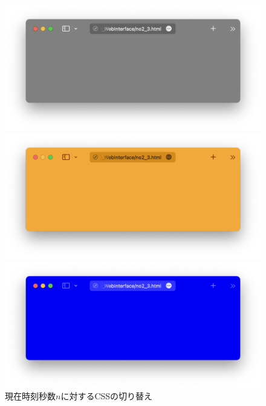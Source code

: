\begin{figure}[H]
    \centering
    \begin{minipage}{.30\textwidth}
        \centering
        \includegraphics[keepaspectratio,width=\textwidth]{../../09_WebInterface/no2_3_gray.png}
    \end{minipage}
    \begin{minipage}{.30\textwidth}
        \centering
        \includegraphics[keepaspectratio,width=\textwidth]{../../09_WebInterface/no2_3_orange.png}
    \end{minipage}
    \begin{minipage}{.30\textwidth}
        \centering
        \includegraphics[keepaspectratio,width=\textwidth]{../../09_WebInterface/no2_3_blue.png}
    \end{minipage}
    \caption{現在時刻秒数\(n\)に対するCSSの切り替え}
\end{figure}
